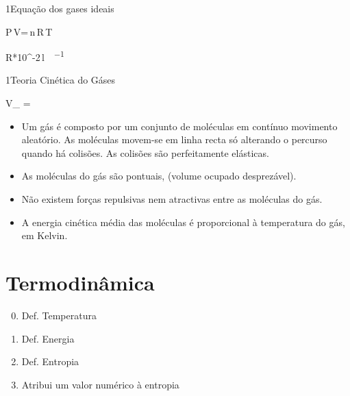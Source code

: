 \begin{sectionBox}1{Equação dos gases ideais}
    \begin{BM}
        P\,V=\,n\,R\,T
    \end{BM}

    \begin{BM}
        R*10^{-2}\,\unit{\litre\atm\per{\K\mole}}
    \end{BM}

\end{sectionBox}

\begin{sectionBox}1{Teoria Cinética do Gáses}

    \begin{BM}
        V_{} = 
    \end{BM}

    \begin{sectionBox}{}
        \begin{itemize}
            \item Um gás é composto por um conjunto de moléculas em contínuo movimento aleatório. As moléculas movem-se em linha recta só alterando o percurso quando há colisões. As colisões são perfeitamente elásticas.
            \item As moléculas do gás são pontuais, (volume ocupado desprezável).
            \item Não existem forças repulsivas nem atractivas entre as moléculas do gás.
            \item A energia cinética média das moléculas é proporcional à temperatura do gás, em Kelvin.
        \end{itemize}
    \end{sectionBox}

\end{sectionBox}


\part*{Termodinâmica}

\begin{sectionBox}{}
    \begin{enumerate}[label=Lei \arabic{enumi}:, leftmargin=3em]\setcounter{enumi}{-1}
        \item Def. Temperatura
        \item Def. Energia
        \item Def. Entropia
        \item Atribui um valor numérico à entropia
    \end{enumerate}
\end{sectionBox}

